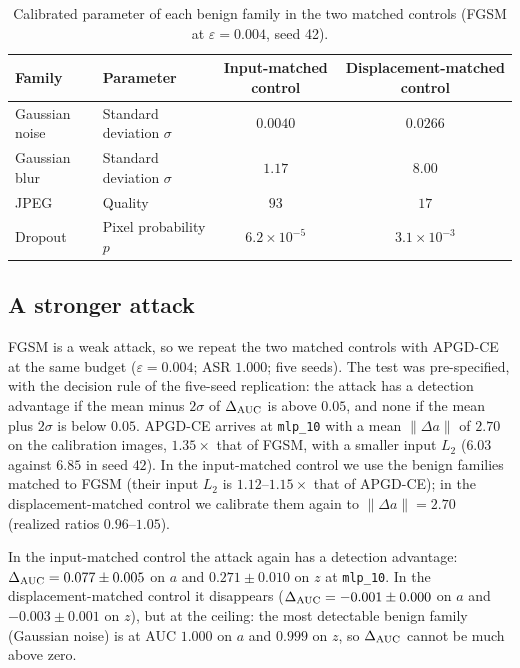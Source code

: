 \documentclass[../ppgc-tese.tex]{subfiles}
\begin{document}
\begin{table}[ht]
  \centering
  \caption{Calibrated parameter of each benign family in the two matched
  controls (FGSM at $\varepsilon{=}0.004$, seed 42).}
  \label{tab:adv-params}
  \small
  \begin{tabular}{@{}llcc@{}}
    \toprule
    Family & Parameter & Input-matched control & Displacement-matched control \\
    \midrule
    Gaussian noise & Standard deviation $\sigma$ & $0.0040$ & $0.0266$ \\
    Gaussian blur & Standard deviation $\sigma$ & $1.17$ & $8.00$ \\
    JPEG & Quality & $93$ & $17$ \\
    Dropout & Pixel probability $p$ & $6.2\times10^{-5}$ & $3.1\times10^{-3}$ \\
    \bottomrule
  \end{tabular}
\end{table}

\subsection{A stronger attack}
\label{sec:adv-apgd-ce}
FGSM is a weak attack, so we repeat the two matched controls with APGD-CE
\cite{croce2020apgd_autoattack} at the same budget ($\varepsilon{=}0.004$; ASR
$1.000$; five seeds). The test was pre-specified, with the decision rule of
the five-seed replication: the attack has a detection advantage if the mean
minus $2\sigma$ of $\Delta_{\mathrm{AUC}}$ is above $0.05$, and none if the mean plus
$2\sigma$ is below $0.05$. APGD-CE arrives at \texttt{mlp\_10} with a mean
$\lVert\Delta a\rVert$ of $2.70$ on the calibration images, $1.35\times$ that
of FGSM, with a smaller input $L_2$ ($6.03$ against $6.85$ in seed $42$). In
the input-matched control we use the benign families matched to FGSM (their
input $L_2$ is $1.12$--$1.15\times$ that of APGD-CE); in the
displacement-matched control we calibrate them again to
$\lVert\Delta a\rVert = 2.70$ (realized ratios $0.96$--$1.05$).

In the input-matched control the attack again has a detection advantage:
$\Delta_{\mathrm{AUC}} = 0.077\pm0.005$ on $a$ and $0.271\pm0.010$ on $z$ at \texttt{mlp\_10}.
In the displacement-matched control it disappears ($\Delta_{\mathrm{AUC}} = -0.001\pm0.000$ on
$a$ and $-0.003\pm0.001$ on $z$), but at the ceiling: the most detectable
benign family (Gaussian noise) is at AUC $1.000$ on $a$ and $0.999$ on $z$, so
$\Delta_{\mathrm{AUC}}$ cannot be much above zero.
\end{document}
